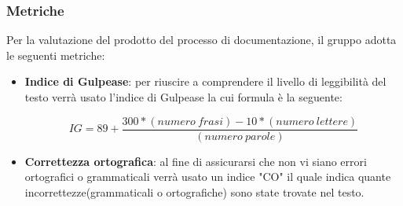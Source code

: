 \subsubsection{Metriche}
Per la valutazione del prodotto del processo di documentazione, il gruppo adotta le seguenti metriche:
\begin{itemize}
	\item \textbf{Indice di Gulpease}: per riuscire a comprendere il livello di leggibilità del testo verrà usato l'indice di Gulpease la cui formula è la seguente:
\begin{center}
\[IG=89+\frac{300*(numero \ frasi)-10*(numero \ lettere)}{(numero \ parole)}\]
\end{center}
	\item \textbf{Correttezza ortografica}: al fine di assicurarsi che non vi siano errori ortografici o grammaticali verrà usato un indice "CO" il quale indica quante incorrettezze(grammaticali o ortografiche) sono state trovate nel testo.
\end{itemize}


 